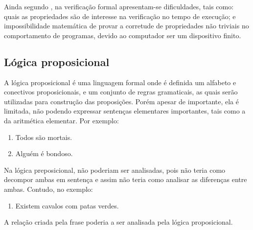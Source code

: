 Ainda segundo \citeauthor{rocha2015verificaccao}, na verificação formal apresentam-se dificuldades, tais como: quais as propriedades são de interesse na verificação no tempo de execução; e impossibilidade matemática de provar a corretude de propriedades não triviais no comportamento de programas, devido ao computador ser um dispositivo finito\cite{cousot2010gentle}. 


\subsection{Lógica proposicional}
A lógica proposicional é uma linguagem formal onde é definida um alfabeto e conectivos proposicionais, e um conjunto de regras gramaticais, as quais serão utilizadas para construção das proposições\cite{souza2017logica}. Porém apesar de importante, ela é limitada, não podendo expressar sentenças elementares importantes, tais como a da aritmética elementar. Por exemplo:
\begin{enumerate}
\item Todos são mortais.
\item Alguém é bondoso.
\end{enumerate}
Na lógica preposicional, não poderiam ser analisadas, pois não teria como decompor ambas em sentença e assim não teria como analisar as diferenças entre ambas\cite{abe2002introducao}. Contudo, no exemplo:
\begin{enumerate}
\item Existem cavalos com patas verdes.
\end{enumerate}
A relação criada pela frase poderia  a ser analisada pela lógica proposicional\cite{abe2002introducao}.

